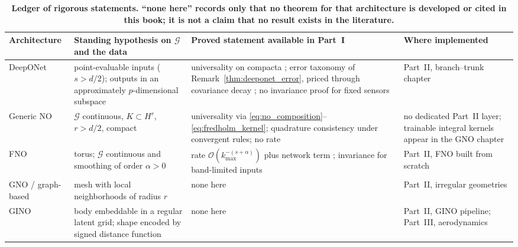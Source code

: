 \begin{table}[htbp]
\centering
\footnotesize
\caption{\textbf{Ledger of rigorous statements. ``none here'' records only that no theorem for that architecture is developed or cited in this book; it is not a claim that no result exists in the literature.}}
\label{tab:ch8-ledger}
\begin{tabularx}{\textwidth}{@{}l >{\raggedright\arraybackslash}X >{\raggedright\arraybackslash}X >{\raggedright\arraybackslash}X@{}}
\toprule
\textbf{Architecture} & \textbf{Standing hypothesis on $\mathcal{G}$ and the data} & \textbf{Proved statement available in Part~I} & \textbf{Where implemented} \\
\midrule
DeepONet \cite{lu2021learning}
& point-evaluable inputs ($s>d/2$); outputs in an approximately $p$-dimensional subspace
& universality on compacta \cite{chen1995universal}; error taxonomy of Remark~\ref{thm:deeponet_error}, priced through covariance decay \cite{lanthaler2022error}; no invariance proof for fixed sensors
& Part~II, branch--trunk chapter \\
Generic NO \cite{kovachki2023neural}
& $\mathcal{G}$ continuous, $K\subset H^r$, $r>d/2$, compact
& universality via \eqref{eq:no_composition}--\eqref{eq:fredholm_kernel}; quadrature consistency under convergent rules; no rate
& no dedicated Part~II layer; trainable integral kernels appear in the GNO chapter \\
FNO \cite{li2021fourier}
& torus; $\mathcal{G}$ continuous and smoothing of order $\alpha>0$
& rate $\mathcal{O}(k_{\max}^{-(s+\alpha)})$ plus network term \cite{kovachki2021universal}; invariance for band-limited inputs
& Part~II, FNO built from scratch \\
GNO / graph-based \cite{li2023geometry,brandstetter2022message}
& mesh with local neighborhoods of radius $r$
& none here
& Part~II, irregular geometries \\
GINO \cite{li2023geometry}
& body embeddable in a regular latent grid; shape encoded by signed distance function
& none here
& Part~II, GINO pipeline; Part~III, aerodynamics \\
\bottomrule
\end{tabularx}
\end{table}


